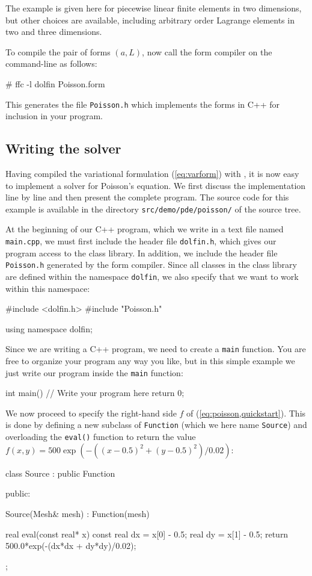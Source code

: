 The example is given here for piecewise linear finite elements in two
dimensions, but other choices are available, including arbitrary order
Lagrange elements in two and three dimensions.

To compile the pair of forms $(a, L)$, now call the form compiler on
the command-line as follows:
\begin{code}
# ffc -l dolfin Poisson.form
\end{code}
This generates the file \texttt{Poisson.h} which implements the forms
in C++ for inclusion in your \dolfin{} program.

\subsection{Writing the solver}

Having compiled the variational formulation (\ref{eq:varform})
with \ffc{}, it is now easy to implement a solver for Poisson's
equation. We first discuss the implementation line by line and then
present the complete program. The source code for this example is
available in the directory \texttt{src/demo/pde/poisson/} of the \dolfin{}
source tree.

At the beginning of our C++ program, which we write in a text file
named \texttt{main.cpp}, we must first include the header file
\texttt{dolfin.h}, which gives our program access to the \dolfin{}
class library. In addition, we include the header file
\texttt{Poisson.h} generated by the form compiler. Since all classes
in the \dolfin{} class library are defined within the namespace
\texttt{dolfin}, we also specify that we want to work within this
namespace:
\begin{code}
#include <dolfin.h>
#include "Poisson.h"
  
using namespace dolfin;
\end{code}

Since we are writing a C++ program, we need to create a \texttt{main}
function.  You are free to organize your program any way you like, but
in this simple example we just write our program inside the
\texttt{main} function:

\begin{code}
int main()
{
  // Write your program here
  return 0;
}
\end{code}

We now proceed to specify the right-hand side $f$ of
(\ref{eq:poisson,quickstart}). This is done by defining a new subclass
of \texttt{Function} (which we here name \texttt{Source}) and
overloading the \texttt{eval()} function to return the value $f(x, y)
= 500 \exp(-((x-0.5)^2 + (y-0.5)^2)/0.02)$:
\begin{code}
class Source : public Function
{
public:
    
  Source(Mesh& mesh) : Function(mesh) {}

  real eval(const real* x) const
  {
    real dx = x[0] - 0.5;
    real dy = x[1] - 0.5;
    return 500.0*exp(-(dx*dx + dy*dy)/0.02);
  }

};
\end{code}


